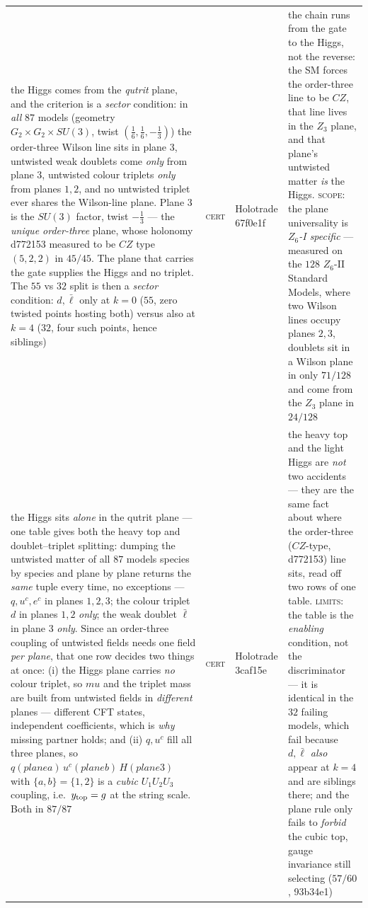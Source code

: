 \documentclass[12pt,a4paper]{article}
\def\mathbb#1{#1}%
\def\textbf#1{#1}%
\def\texttt#1{#1}%
\def\text#1{#1}%
\def\mu{mu}%
\theoremstyle{definition}
\newcommand{\ZZ}{\mathbb{Z}}
\begin{document}
\begin{center}
\begin{tabular}{@{}p{}llp{}@{}}
\textbf{the Higgs comes from the \emph{qutrit} plane, and the criterion is a \emph{sector} condition}: in \emph{all} $87$ models (geometry $G_2{\times}G_2{\times}SU(3)$, twist $(\tfrac16,\tfrac16,-\tfrac13)$) the order-three Wilson line sits in plane $3$, untwisted weak doublets come \emph{only} from plane $3$, untwisted colour triplets \emph{only} from planes $1,2$, and no untwisted triplet ever shares the Wilson-line plane. Plane $3$ is the $SU(3)$ factor, twist $-\tfrac13$ --- the \emph{unique order-three} plane, whose holonomy \texttt{d772153} measured to be $CZ$ type $(5,2,2)$ in $45/45$. The plane that carries the gate supplies the Higgs and no triplet. The $55$ vs $32$ split is then a \emph{sector} condition: $d,\bar\ell$ only at $k{=}0$ ($55$, zero twisted points hosting both) versus also at $k{=}4$ ($32$, four such points, hence siblings) & \textsc{cert} & Holotrade \texttt{67f0e1f} & the chain runs from the gate to the Higgs, not the reverse: the SM forces the order-three line to be $CZ$, that line lives in the $\ZZ_3$ plane, and that plane's untwisted matter \emph{is} the Higgs. \textsc{scope}: the plane universality is \emph{$\ZZ_6$-I specific} --- measured on the $128$ $\ZZ_6$-II Standard Models, where two Wilson lines occupy planes $2,3$, doublets sit in a Wilson plane in only $71/128$ and come from the $\ZZ_3$ plane in $24/128$ \\
\textbf{the Higgs sits \emph{alone} in the qutrit plane --- one table gives both the heavy top and doublet--triplet splitting}: dumping the untwisted matter of all $87$ models species by species and plane by plane returns the \emph{same} tuple every time, no exceptions --- $q,u^c,e^c$ in planes $1,2,3$; the colour triplet $d$ in planes $1,2$ \emph{only}; the weak doublet $\bar\ell$ in plane $3$ \emph{only}. Since an order-three coupling of untwisted fields needs one field \emph{per plane}, that one row decides two things at once: (i) the Higgs plane carries \emph{no} colour triplet, so $\mu$ and the triplet mass are built from untwisted fields in \emph{different} planes --- different CFT states, independent coefficients, which is \emph{why} missing partner holds; and (ii) $q,u^c$ fill all three planes, so $q(\text{plane }a)\,u^c(\text{plane }b)\,H(\text{plane }3)$ with $\{a,b\}=\{1,2\}$ is a \emph{cubic} $U_1U_2U_3$ coupling, i.e.\ $y_{\rm top}=g$ at the string scale. Both in $87/87$ & \textsc{cert} & Holotrade \texttt{3caf15e} & the heavy top and the light Higgs are \emph{not} two accidents --- they are the same fact about where the order-three ($CZ$-type, \texttt{d772153}) line sits, read off two rows of one table. \textsc{limits}: the table is the \emph{enabling} condition, not the discriminator --- it is identical in the $32$ failing models, which fail because $d,\bar\ell$ \emph{also} appear at $k{=}4$ and are siblings there; and the plane rule only fails to \emph{forbid} the cubic top, gauge invariance still selecting ($57/60$, \texttt{93b34e1}) \\

\end{tabular}
\end{center}
\end{document}

